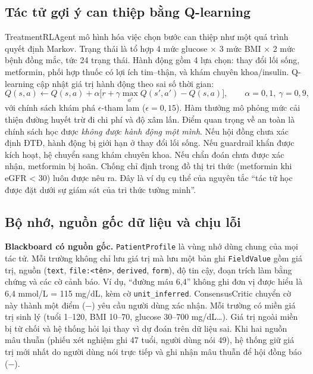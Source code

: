 \subsection{Tác tử gợi ý can thiệp bằng Q-learning}

TreatmentRLAgent mô hình hóa việc chọn bước can thiệp như một quá trình quyết định Markov. Trạng thái là tổ hợp 4 mức glucose × 3 mức BMI × 2 mức bệnh đồng mắc, tức 24 trạng thái. Hành động gồm 4 lựa chọn: thay đổi lối sống, metformin, phối hợp thuốc có lợi ích tim–thận, và khám chuyên khoa/insulin. Q-learning \cite{watkins1992,sutton2018} cập nhật giá trị hành động theo sai số thời gian:
\begin{equation}
Q(s,a) \leftarrow Q(s,a) + \alpha\big[r + \gamma\max_{a'}Q(s',a') - Q(s,a)\big],\qquad \alpha=0{,}1,\ \gamma=0{,}9,
\label{eq:qlearn}
\end{equation}
với chính sách khám phá $\epsilon$-tham lam ($\epsilon=0{,}15$). Hàm thưởng mô phỏng mức cải thiện đường huyết trừ đi chi phí và độ xâm lấn. Điểm quan trọng về an toàn là chính sách học được \emph{không được hành động một mình}. Nếu hội đồng chưa xác định ĐTĐ, hành động bị giới hạn ở thay đổi lối sống. Nếu guardrail khẩn được kích hoạt, hệ chuyển sang khám chuyên khoa. Nếu chẩn đoán chưa được xác nhận, metformin bị hoãn. Chống chỉ định trong đồ thị tri thức (metformin khi eGFR < 30) luôn được nêu ra. Đây là ví dụ cụ thể của nguyên tắc ``tác tử học được đặt dưới sự giám sát của tri thức tường minh''.

\subsection{Bộ nhớ, nguồn gốc dữ liệu và chịu lỗi}

\textbf{Blackboard có nguồn gốc.} \texttt{PatientProfile} là vùng nhớ dùng chung của mọi tác tử. Mỗi trường không chỉ lưu giá trị mà lưu một bản ghi \texttt{FieldValue} gồm giá trị, nguồn (\texttt{text}, \texttt{file:<tên>}, \texttt{derived}, \texttt{form}), độ tin cậy, đoạn trích làm bằng chứng và các cờ cảnh báo. Ví dụ, ``đường máu 6,4'' không ghi đơn vị được hiểu là 6,4 mmol/L = 115 mg/dL, kèm cờ \texttt{unit\_inferred}. ConsensusCritic chuyển cờ này thành một điểm (−) yêu cầu người dùng xác nhận. Mỗi trường có miền giá trị sinh lý (tuổi 1–120, BMI 10–70, glucose 30–700 mg/dL\ldots). Giá trị ngoài miền bị từ chối và hệ thống hỏi lại thay vì dự đoán trên dữ liệu sai. Khi hai nguồn mâu thuẫn (phiếu xét nghiệm ghi 47 tuổi, người dùng nói 49), hệ thống giữ giá trị mới nhất do người dùng nói trực tiếp và ghi nhận mâu thuẫn để hội đồng báo (−).

